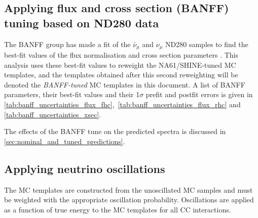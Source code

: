 \subsection {Applying flux and cross section (BANFF) tuning based on ND280 data}
\label{sec:banff_weights}

The BANFF group has made a fit of the $\bar{\nu}_\mu$ and  $\nu_\mu$ 
ND280 samples 
to find the best-fit values of the flux normalisation and cross section parameters \cite{BANFF2015}. This 
analysis uses these best-fit values to reweight the NA61/SHINE-tuned MC templates, and the templates obtained after this second 
reweighting will be denoted the {\em BANFF-tuned} MC templates in this document.
A list of BANFF parameters, their best-fit values and their 1$\sigma$ prefit and postfit errors is given in 
\cref{tab:banff_uncertainties_flux_fhc},~\ref{tab:banff_uncertainties_flux_rhc} and
\ref{tab:banff_uncertainties_xsec}.

The effects of the BANFF tune on the predicted spectra is discussed 
in \cref{sec:nominal_and_tuned_predictions}. 


\subsection{Applying neutrino oscillations}
\label{sec:applying_oscillations}

The MC templates are constructed from the unoscillated MC samples and must be weighted with the appropriate oscillation 
probability. Oscillations are applied as a function of true energy to the
  MC templates for all CC interactions.

